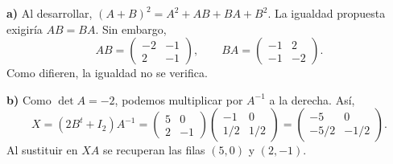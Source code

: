 \textbf{a)} Al desarrollar, $(A+B)^2=A^2+AB+BA+B^2$.
La igualdad propuesta exigiría $AB=BA$. Sin embargo,
\[
AB=\begin{pmatrix}-2&-1\\2&-1\end{pmatrix},\qquad
BA=\begin{pmatrix}-1&2\\-1&-2\end{pmatrix}.
\]
Como difieren, la igualdad no se verifica.

\textbf{b)} Como $\det A=-2$, podemos multiplicar por $A^{-1}$
a la derecha. Así,
\[
X=(2B^t+I_2)A^{-1}
=\begin{pmatrix}5&0\\2&-1\end{pmatrix}
\begin{pmatrix}-1&0\\1/2&1/2\end{pmatrix}
=\boxed{\begin{pmatrix}-5&0\\-5/2&-1/2\end{pmatrix}}.
\]
Al sustituir en $XA$ se recuperan las filas $(5,0)$ y $(2,-1)$.
